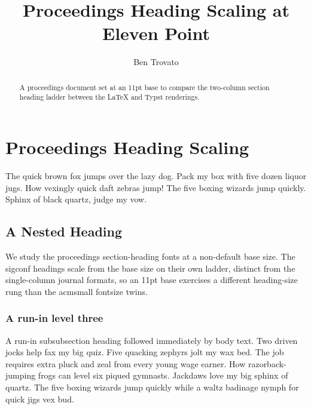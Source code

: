 \documentclass[sigconf,11pt]{acmart}
\begin{document}
\title{Proceedings Heading Scaling at Eleven Point}

\author{Ben Trovato}

\begin{abstract}
  A proceedings document set at an 11pt base to compare the two-column section
  heading ladder between the LaTeX and Typst renderings.
\end{abstract}

\maketitle

\section{Proceedings Heading Scaling}
The quick brown fox jumps over the lazy dog. Pack my box with five dozen liquor
jugs. How vexingly quick daft zebras jump! The five boxing wizards jump quickly.
Sphinx of black quartz, judge my vow.

\subsection{A Nested Heading}
We study the proceedings section-heading fonts at a non-default base size. The
sigconf headings scale from the base size on their own ladder, distinct from the
single-column journal formats, so an 11pt base exercises a different heading-size
rung than the acmsmall fontsize twins.

\subsubsection{A run-in level three}
A run-in subsubsection heading followed immediately by body text. Two driven jocks
help fax my big quiz. Five quacking zephyrs jolt my wax bed. The job requires
extra pluck and zeal from every young wage earner. How razorback-jumping frogs
can level six piqued gymnasts. Jackdaws love my big sphinx of quartz. The five
boxing wizards jump quickly while a waltz badinage nymph for quick jigs vex bud.
\end{document}
